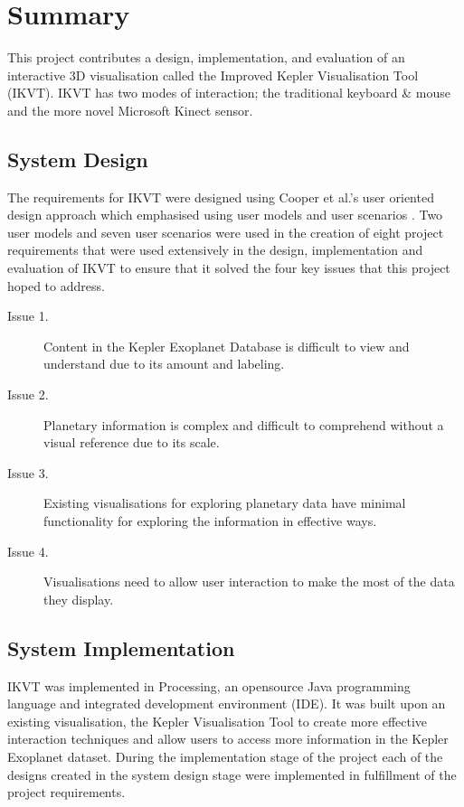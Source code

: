 \chapter{Summary}\label{C:con}
This project contributes a design, implementation, and evaluation of an
interactive 3D visualisation called the Improved Kepler Visualisation Tool
(IKVT). IKVT has two modes of interaction; the traditional keyboard \& mouse and
the more novel Microsoft Kinect sensor. 

\section{System Design}
The requirements for IKVT were designed using Cooper et al.'s user oriented
design approach which emphasised using user models and user scenarios \cite{AboutFace3}.  Two user
models and seven user scenarios were used in the creation of eight project requirements that
were used extensively in the design, implementation and evaluation of IKVT to ensure that it
solved the four key issues that this project hoped to address.
\begin{description}
 \item[Issue 1.] Content in the Kepler Exoplanet Database is difficult to view
and
understand due to its amount and labeling.
 \item[Issue 2.] Planetary information is complex and difficult to comprehend
without
a visual reference due to its scale.
 \item[Issue 3.] Existing visualisations for exploring planetary data have
minimal
functionality for exploring the information in effective ways.
 \item[Issue 4.] Visualisations need to allow user interaction to make the most
of
the data they display.
\end{description}

\section{System Implementation}
IKVT was implemented in Processing, an opensource Java programming language and
integrated development environment (IDE). It was built upon an existing
visualisation, the Kepler Visualisation Tool \cite{kepler_github,
kepler_article} to create more effective interaction techniques and allow users to access more information in the Kepler Exoplanet dataset. During the implementation stage of the project each of the
designs created in the system design stage were implemented in
fulfillment of the project requirements. 

